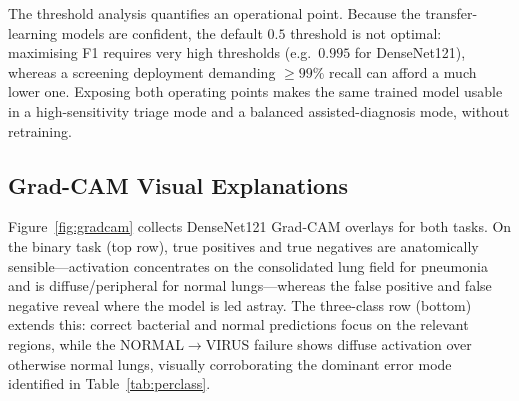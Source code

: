 \documentclass[runningheads]{llncs}
\begin{document}
The threshold analysis quantifies an operational point. Because the
transfer-learning models are confident, the default $0.5$ threshold is not
optimal: maximising F1 requires very high thresholds (e.g.\ $0.995$ for
DenseNet121), whereas a screening deployment demanding $\geq99\%$ recall can
afford a much lower one. Exposing both operating points makes the same
trained model usable in a high-sensitivity triage mode and a balanced
assisted-diagnosis mode, without retraining.

\subsection{Grad-CAM Visual Explanations}

Figure~\ref{fig:gradcam} collects DenseNet121 Grad-CAM overlays for both
tasks. On the binary task (top row), true positives and true negatives are
anatomically sensible---activation concentrates on the consolidated lung
field for pneumonia and is diffuse/peripheral for normal lungs---whereas the
false positive and false negative reveal where the model is led astray. The
three-class row (bottom) extends this: correct bacterial and normal
predictions focus on the relevant regions, while the
NORMAL$\rightarrow$VIRUS failure shows diffuse activation over otherwise
normal lungs, visually corroborating the dominant error mode identified in
Table~\ref{tab:perclass}.
\end{document}

